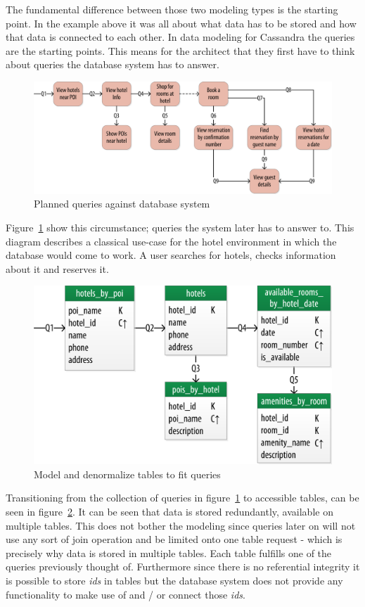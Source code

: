 The fundamental difference between those two modeling types is the starting point. In the example above it was all about what data has to be stored and how that data is connected to each other.
In data modeling for Cassandra the queries are the starting points. This means for the architect that they first have to think about queries the database system has to answer.

\begin{figure}[H]
    \centering
    \includegraphics[width=0.75\columnwidth]{img/model_example_queries_step2.png}
    \caption{Planned queries against database system \autocite{cassandra_oreilly}}
    \label{fig:cassandra:model_data2}
\end{figure}

Figure~\ref{fig:cassandra:model_data2} show this circumstance; queries the system later has to answer to. This diagram describes a classical use-case for the hotel environment in which the database would come to work. A user searches for hotels, checks information about it and reserves it.

\begin{figure}[H]
    \centering
    \includegraphics[width=0.75\columnwidth]{img/model_example_chebotko_step3.png}
    \caption{Model and denormalize tables to fit queries \autocite{cassandra_oreilly}}
    \label{fig:cassandra:model_data3}
\end{figure}

Transitioning from the collection of queries in figure~\ref{fig:cassandra:model_data2} to accessible tables, can be seen in figure~\ref{fig:cassandra:model_data3}. It can be seen that data is stored redundantly, available on multiple tables. This does not bother the modeling since queries later on will not use any sort of join operation and be limited onto one table request - which is precisely why data is stored in multiple tables. Each table fulfills one of the queries previously thought of. Furthermore since there is no referential integrity it is possible to store \textit{ids} in tables but the database system does not provide any functionality to make use of and / or connect those \textit{ids}.

